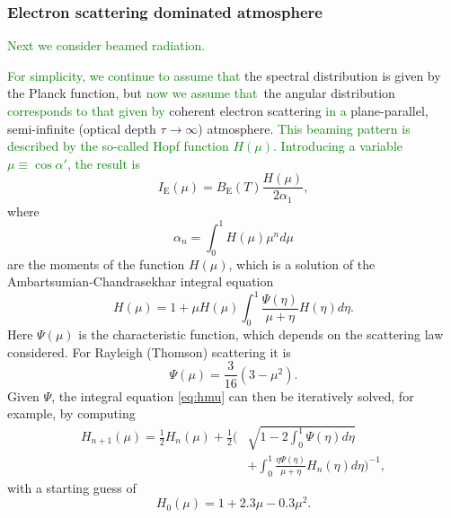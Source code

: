 \documentclass{aa}
\newcommand{\refe}[1]{\textcolor{green}{{#1}}}
\newcommand{\refedel}[1]{}
\begin{document}
\subsubsection{Electron scattering dominated atmosphere}

\refe{Next we consider beamed radiation.}
\refedel{The second angular distribution we consider is the so-called `Hopf profile', which is no longer isotropic.}
\refe{For simplicity, we continue to assume that} the spectral distribution is given by the Planck function, but \refe{now we assume that} the angular distribution \refe{corresponds to that given by} coherent electron scattering \refe{in a} plane-parallel, semi-infinite (optical depth $\tau \rightarrow \infty$) atmosphere.
\refe{This beaming pattern is described by the so-called Hopf function $H(\mu)$.}
\refe{Introducing a variable $\mu \equiv \cos\alpha'$, the result is}
\begin{equation}\label{eq:hopf}
  I_{\mathrm{E}}(\mu) = B_{\mathrm{E}}(T) \frac{H(\mu)}{2\alpha_1},
\end{equation}
where
\begin{equation}
  \alpha_n = \int_0^1 H(\mu) \mu^n d\mu
\end{equation}
are the moments of the function $H(\mu)$, which is a solution of the Ambartsumian-Chandrasekhar integral equation \citep[see e.g.][]{Cha60,Sob63}
\begin{equation}\label{eq:hmu}
  H(\mu) = 1 + \mu H(\mu) \int_0^1 \frac{\Psi(\eta)}{\mu + \eta} H(\eta) d\eta.
\end{equation}
Here $\Psi(\mu)$ is the characteristic function, which depends on the scattering law considered.
For Rayleigh (Thomson) scattering it is
\begin{equation}
  \Psi(\mu) = \frac{3}{16}(3-\mu^2).
\end{equation}
Given $\Psi$, the integral equation \eqref{eq:hmu} can then be iteratively solved, for example, by computing
\begin{equation}\begin{split}
    H_{n+1}(\mu) =  \frac{1}{2} H_n(\mu) + \frac{1}{2}\Biggl(& \sqrt{1-2\int_0^1 \Psi(\eta)d\eta} \\
                    &+ \int_0^1 \frac{\eta \Psi(\eta)}{\mu + \eta} H_n(\eta) d\eta \Biggr)^{-1},
\end{split}\end{equation}
with a starting guess of
\begin{equation}\label{eq:apprx_hopf}
  H_0(\mu) = 1 + 2.3\mu - 0.3\mu^2.
\end{equation}
\end{document}
